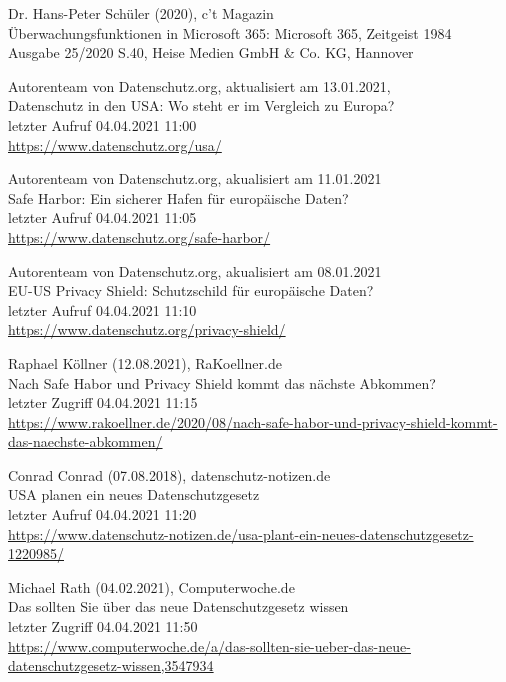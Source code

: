 \begin{thebibliography}{9}
    \bibitem{}
        Dr. Hans-Peter Schüler (2020), c't Magazin
        \\Überwachungsfunktionen in Microsoft 365: Microsoft 365, Zeitgeist 1984
        \\Ausgabe 25/2020 S.40, Heise Medien GmbH \& Co. KG, Hannover

    \bibitem{}
        Autorenteam von Datenschutz.org, aktualisiert am 13.01.2021,
        \\Datenschutz in den USA: Wo steht er im Vergleich zu Europa?
        \\letzter Aufruf 04.04.2021 11:00
        \\\url{https://www.datenschutz.org/usa/}

    \bibitem{}
        Autorenteam von Datenschutz.org, akualisiert am 11.01.2021
        \\Safe Harbor: Ein sicherer Hafen für europäische Daten?
        \\letzter Aufruf 04.04.2021 11:05
        \\\url{https://www.datenschutz.org/safe-harbor/}

    \bibitem{}
        Autorenteam von Datenschutz.org, akualisiert am 08.01.2021
        \\EU-US Privacy Shield: Schutzschild für europäische Daten?
        \\letzter Aufruf 04.04.2021 11:10
        \\\url{https://www.datenschutz.org/privacy-shield/}

    \bibitem{}
        Raphael Köllner (12.08.2021), RaKoellner.de
        \\Nach Safe Habor und Privacy Shield kommt das nächste Abkommen?
        \\letzter Zugriff 04.04.2021 11:15
        \\\url{https://www.rakoellner.de/2020/08/nach-safe-habor-und-privacy-shield-kommt-das-naechste-abkommen/}

    \bibitem{}
        Conrad Conrad (07.08.2018), datenschutz-notizen.de
        \\USA planen ein neues Datenschutzgesetz
        \\letzter Aufruf 04.04.2021 11:20
        \\\url{https://www.datenschutz-notizen.de/usa-plant-ein-neues-datenschutzgesetz-1220985/}

    \bibitem{}
        Michael Rath (04.02.2021), Computerwoche.de
        \\Das sollten Sie über das neue Datenschutzgesetz wissen
        \\letzter Zugriff 04.04.2021 11:50
        \\\url{https://www.computerwoche.de/a/das-sollten-sie-ueber-das-neue-datenschutzgesetz-wissen,3547934}


\end{thebibliography}
